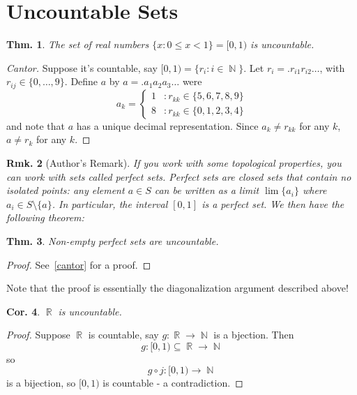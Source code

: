 \documentclass[12pt, a4paper]{book}
\DeclareMathOperator{\N}{\mathbb{N}}
\DeclareMathOperator{\R}{\mathbb{R}}
\newtheorem{theorem}{Thm.}[section]
\newtheorem{corollary}[theorem]{Cor.}
\newtheorem{remark}[theorem]{Rmk.}
\theoremstyle{nonumberplain}
\newtheorem{proof}{Proof}
\begin{document}
\section{Uncountable Sets}
\begin{theorem}
    The set of real numbers $\{x:0\leq x<1\}=[0,1)$ is uncountable.
\end{theorem}
\begin{proof}[Cantor]
    Suppose it's countable, say $[0,1)=\{r_i:i\in\N\}$. Let $r_i=.r_{i1}r_{i2}\ldots$, with $r_{ij}\in\{0,\ldots,9\}$.
    Define $a$ by $a=.a_1a_2a_3\ldots$ were
    \[a_k=
    \begin{cases}
        1 &: r_{kk}\in\{5,6,7,8,9\}\\
        8 &: r_{kk}\in\{0,1,2,3,4\}
    \end{cases}
    \]
    and note that $a$ has a unique decimal representation. Since $a_k\neq r_{kk}$ for any $k$, $a\neq r_k$ for any $k$.
\end{proof}
\begin{remark}[Author's Remark]
    If you work with some topological properties, you can work with sets called \textit{perfect sets}. Perfect sets
    are closed sets that contain no isolated points: any element $a\in S$ can be written as a limit $\lim\{a_i\}$
    where $a_i\in S\setminus\{a\}$. In particular, the interval $[0,1]$ is a perfect set. We then have the following
    theorem:
\end{remark}
\begin{theorem}
    Non-empty perfect sets are uncountable.
\end{theorem}
\begin{proof}
    See~\ref{cantor} for a proof.
\end{proof}
Note that the proof is essentially the diagonalization argument described above!
\begin{corollary}
    $\R$ is uncountable.
\end{corollary}
\begin{proof}
    Suppose $\R$ is countable, say $g:\R\to\N$ is a bjection. Then
    \[ g:[0,1)\subseteq\R\to\N\]
    so
    \[g\circ j:[0,1)\to\N\]
    is a bijection, so $[0,1)$ is countable - a contradiction.
\end{proof}
\end{document}
